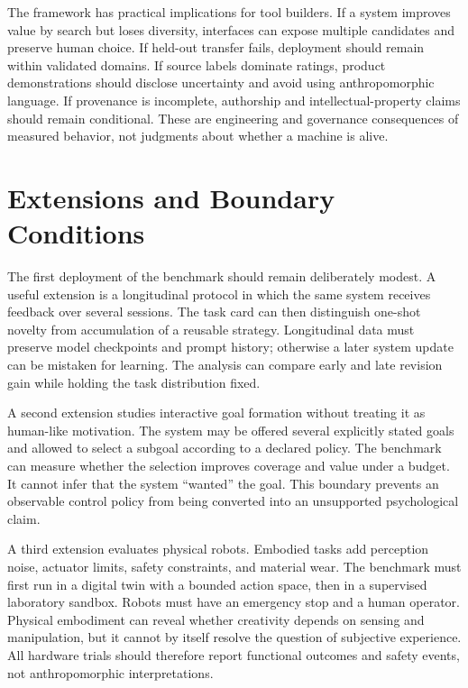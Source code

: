 \documentclass[conference]{IEEEtran}
\begin{document}
The framework has practical implications for tool builders. If a system improves value
by search but loses diversity, interfaces can expose multiple candidates and preserve
human choice. If held-out transfer fails, deployment should remain within validated
domains. If source labels dominate ratings, product demonstrations should disclose
uncertainty and avoid using anthropomorphic language. If provenance is incomplete,
authorship and intellectual-property claims should remain conditional. These are
engineering and governance consequences of measured behavior, not judgments about
whether a machine is alive.

\section{Extensions and Boundary Conditions}
\label{sec:extensions}

The first deployment of the benchmark should remain deliberately modest. A useful
extension is a longitudinal protocol in which the same system receives feedback over
several sessions. The task card can then distinguish one-shot novelty from accumulation
of a reusable strategy. Longitudinal data must preserve model checkpoints and prompt
history; otherwise a later system update can be mistaken for learning. The analysis can
compare early and late revision gain while holding the task distribution fixed.

A second extension studies interactive goal formation without treating it as human-like
motivation. The system may be offered several explicitly stated goals and allowed to
select a subgoal according to a declared policy. The benchmark can measure whether the
selection improves coverage and value under a budget. It cannot infer that the system
``wanted'' the goal. This boundary prevents an observable control policy from being
converted into an unsupported psychological claim.

A third extension evaluates physical robots. Embodied tasks add perception noise,
actuator limits, safety constraints, and material wear. The benchmark must first run in
a digital twin with a bounded action space, then in a supervised laboratory sandbox.
Robots must have an emergency stop and a human operator. Physical embodiment can reveal
whether creativity depends on sensing and manipulation, but it cannot by itself resolve
the question of subjective experience. All hardware trials should therefore report
functional outcomes and safety events, not anthropomorphic interpretations.
\end{document}
